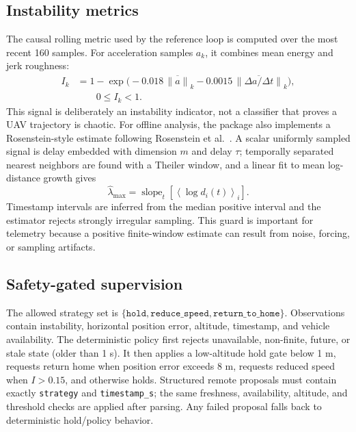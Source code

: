 \documentclass[10pt,conference]{IEEEtran}
\begin{document}
\subsection{Instability metrics}
The causal rolling metric used by the reference loop is computed over the most
recent 160 samples. For acceleration samples $a_k$, it combines mean energy and
jerk roughness:
\begin{equation}
 \begin{aligned}
 I_k&=1-\exp\bigl(-0.018\,\overline{\|a\|}_k
 -0.0015\,\overline{\|\Delta a/\Delta t\|}_k\bigr),\\
 &\qquad 0\leq I_k<1.
 \end{aligned}
 \label{eq:indicator}
\end{equation}
This signal is deliberately an instability indicator, not a classifier that
proves a UAV trajectory is chaotic. For offline analysis, the package also
implements a Rosenstein-style estimate following Rosenstein et al.~\cite{rosenstein}.
A scalar uniformly sampled signal is
delay embedded with dimension $m$ and delay $\tau$; temporally separated nearest
neighbors are found with a Theiler window, and a linear fit to mean log-distance
growth gives
\begin{equation}
 \hat{\lambda}_{\max}=\operatorname{slope}_t\left[
 \left\langle\log d_i(t)\right\rangle_i\right].
 \label{eq:lyap}
\end{equation}
Timestamp intervals are inferred from the median positive interval and the
estimator rejects strongly irregular sampling. This guard is important for
telemetry because a positive finite-window estimate can result from noise,
forcing, or sampling artifacts.

\subsection{Safety-gated supervision}
The allowed strategy set is $\{\texttt{hold},\texttt{reduce\_speed},
\texttt{return\_to\_home}\}$. Observations contain instability, horizontal
position error, altitude, timestamp, and vehicle availability. The deterministic
policy first rejects unavailable, non-finite, future, or stale state (older than
1 s). It then applies a low-altitude hold gate below 1 m, requests return home
when position error exceeds 8 m, requests reduced speed when $I>0.15$, and
otherwise holds. Structured remote proposals must contain exactly
\texttt{strategy} and \texttt{timestamp\_s}; the same freshness, availability,
altitude, and threshold checks are applied after parsing. Any failed proposal
falls back to deterministic hold/policy behavior.
\end{document}
